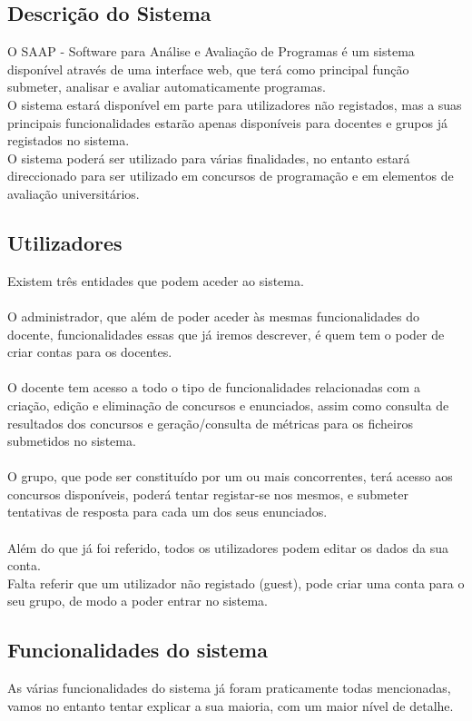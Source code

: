 \subsection{Descrição do Sistema}
O SAAP - Software para Análise e Avaliação de Programas é um sistema disponível através de uma interface web, que terá como principal função 
submeter, analisar e avaliar automaticamente programas.\\
O sistema estará disponível em parte para utilizadores não registados, mas a suas principais funcionalidades estarão apenas disponíveis para docentes 
e grupos já registados no sistema.\\
O sistema poderá ser utilizado para várias finalidades, no entanto estará direccionado para ser utilizado em concursos de programação e em elementos 
de avaliação universitários.

\subsection{Utilizadores}
Existem três entidades que podem aceder ao sistema.\\ \\
O administrador, que além de poder aceder às mesmas funcionalidades do docente, funcionalidades essas que já iremos descrever, é quem tem o poder de
criar contas para os docentes.\\
\\
O docente tem acesso a todo o tipo de funcionalidades relacionadas com a criação, edição e eliminação de concursos e enunciados, assim como consulta
de resultados dos concursos e geração/consulta de métricas para os ficheiros submetidos no sistema.\\
\\
O grupo, que pode ser constituído por um ou mais concorrentes, terá acesso aos concursos disponíveis, poderá tentar registar-se nos mesmos, e submeter
tentativas de resposta para cada um dos seus enunciados.\\
\\
Além do que já foi referido, todos os utilizadores podem editar os dados da sua conta.\\ 
Falta referir que um utilizador não registado (guest), pode criar uma conta para o seu grupo, de modo a poder entrar no sistema.

\subsection{Funcionalidades do sistema}
As várias funcionalidades do sistema já foram praticamente todas mencionadas, vamos no entanto tentar explicar a sua maioria, com um maior nível de
detalhe.

